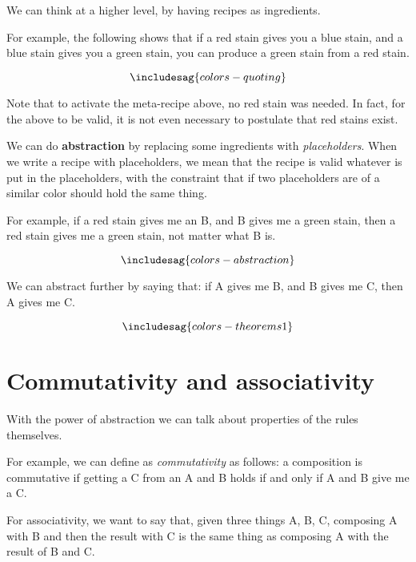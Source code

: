 We can think at a higher level, by having recipes as ingredients.

For example, the following shows that if a red stain gives you a blue stain, and a blue stain gives you a green stain, you can produce a green stain from a red stain.


\begin{equation*}
\includesag{colors-quoting}
\end{equation*}


Note that to activate the meta-recipe above, no red stain was needed.
In fact, for the above to be valid, it is not even necessary to postulate that red stains exist.

We can do \textbf{abstraction} by replacing some ingredients with \emph{placeholders}.
When we write a recipe with placeholders, we mean that the recipe is valid whatever is put in the placeholders, with the constraint that if two placeholders are of a similar color should hold the same thing.

For example, if a red stain gives me an B, and B gives me a green stain, then a red stain gives me a green stain, not matter what B is.

\begin{equation*}
  \includesag{colors-abstraction}
\end{equation*}


We can abstract further by saying that: if A gives me B, and B gives me C, then A gives me C.

\begin{equation*}
  \includesag{colors-theorems1}
\end{equation*}


\section{Commutativity and associativity}

With the power of abstraction we can talk about properties of the rules themselves.

For example, we can define as \emph{commutativity} as follows: a composition is commutative if getting a C from an A and B holds if and only if A and B give me a C.

\begin{center}
\end{center}

For associativity, we want to say that, given three things A, B, C, composing A with B and then the result with C is the same thing as composing A with the result of B and C.


